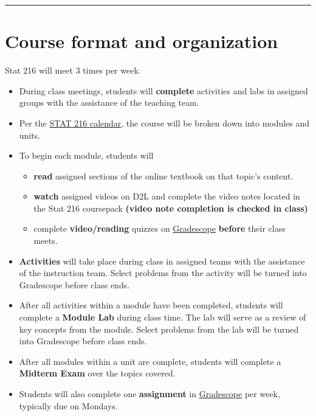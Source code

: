 \documentclass[
]{article}
\providecommand{\tightlist}{%
  \setlength{\itemsep}{0pt}\setlength{\parskip}{0pt}}
\begin{document}
\begin{center}\rule{0.5\linewidth}{0.5pt}\end{center}

\section{Course format and
organization}\label{course-format-and-organization}

Stat 216 will meet 3 times per week.

\begin{itemize}
\tightlist
\item
  During class meetings, students will \textbf{complete} activities and
  labs in assigned groups with the assistance of the teaching team.
\item
  Per the \href{calendars/S25-Stat216_Calendar.pdf}{STAT 216 calendar},
  the course will be broken down into modules and units.
\item
  To begin each module, students will

  \begin{itemize}
  \tightlist
  \item
    \textbf{read} assigned sections of the online textbook on that
    topic's content.
  \item
    \textbf{watch} assigned videos on D2L and complete the video notes
    located in the Stat 216 coursepack \textbf{(video note completion is
    checked in class)}
  \item
    complete \textbf{video/reading} quizzes on
    \href{https://www.gradescope.com/}{Gradescope} \textbf{before} their
    class meets.
  \end{itemize}
\item
  \textbf{Activities} will take place during class in assigned teams
  with the assistance of the instruction team. Select problems from the
  activity will be turned into Gradescope before class ends.
\item
  After all activities within a module have been completed, students
  will complete a \textbf{Module Lab} during class time. The lab will
  serve as a review of key concepts from the module. Select problems
  from the lab will be turned into Gradescope before class ends.
\item
  After all modules within a unit are complete, students will complete a
  \textbf{Midterm Exam} over the topics covered.
\item
  Students will also complete one \textbf{assignment} in
  \href{https://www.gradescope.com/}{Gradescope} per week, typically due
  on Mondays.
\end{itemize}
\end{document}
